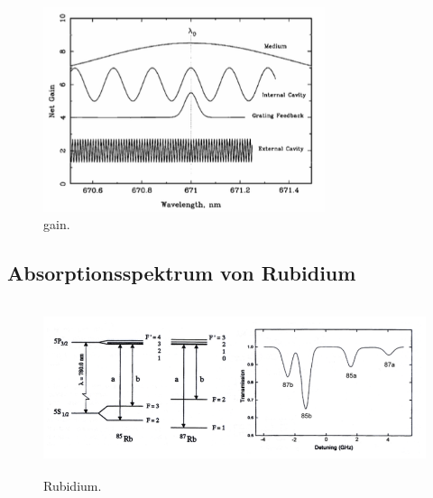 \begin{figure}[H]
    \centering
    \includegraphics[height=6cm]{content/pics/gain.png}
    \caption{gain. \cite{V60}}
    \label{fig:grain}
\end{figure}

\subsection{Absorptionsspektrum von Rubidium}

\begin{figure}[H]
    \centering
    \includegraphics[height=5cm]{content/pics/Rubidium.png}
    \caption{Rubidium. \cite{V60}}
    \label{fig:rubidium}
\end{figure}

